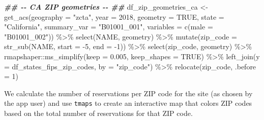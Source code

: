 \documentclass[
  11 pt,
  openany]{book}
\newenvironment{Shaded}{\begin{snugshade}}{\end{snugshade}}
\newcommand{\AttributeTok}[1]{\textcolor[rgb]{0.77,0.63,0.00}{#1}}
\newcommand{\ConstantTok}[1]{\textcolor[rgb]{0.00,0.00,0.00}{#1}}
\newcommand{\DecValTok}[1]{\textcolor[rgb]{0.00,0.00,0.81}{#1}}
\newcommand{\DocumentationTok}[1]{\textcolor[rgb]{0.56,0.35,0.01}{\textbf{\textit{#1}}}}
\newcommand{\FloatTok}[1]{\textcolor[rgb]{0.00,0.00,0.81}{#1}}
\newcommand{\FunctionTok}[1]{\textcolor[rgb]{0.00,0.00,0.00}{#1}}
\newcommand{\NormalTok}[1]{#1}
\newcommand{\OtherTok}[1]{\textcolor[rgb]{0.56,0.35,0.01}{#1}}
\newcommand{\SpecialCharTok}[1]{\textcolor[rgb]{0.00,0.00,0.00}{#1}}
\newcommand{\StringTok}[1]{\textcolor[rgb]{0.31,0.60,0.02}{#1}}
\begin{document}
\begin{Shaded}
\begin{Highlighting}[]
\DocumentationTok{\#\# {-}{-} CA ZIP geometries {-}{-} \#\#}
\NormalTok{df\_zip\_geometries\_ca }\OtherTok{\textless{}{-}} \FunctionTok{get\_acs}\NormalTok{(}\AttributeTok{geography =} \StringTok{"zcta"}\NormalTok{, }\AttributeTok{year =} \DecValTok{2018}\NormalTok{, }
                                \AttributeTok{geometry =} \ConstantTok{TRUE}\NormalTok{,}
                                \AttributeTok{state =} \StringTok{"California"}\NormalTok{,}
                                \AttributeTok{summary\_var =} \StringTok{"B01001\_001"}\NormalTok{,}
                                \AttributeTok{variables =} \FunctionTok{c}\NormalTok{(}\AttributeTok{male =} \StringTok{"B01001\_002"}\NormalTok{)) }\SpecialCharTok{\%\textgreater{}\%}
  \FunctionTok{select}\NormalTok{(NAME, geometry) }\SpecialCharTok{\%\textgreater{}\%}
  \FunctionTok{mutate}\NormalTok{(}\AttributeTok{zip\_code =} \FunctionTok{str\_sub}\NormalTok{(NAME, }\AttributeTok{start =} \SpecialCharTok{{-}}\DecValTok{5}\NormalTok{, }\AttributeTok{end =} \SpecialCharTok{{-}}\DecValTok{1}\NormalTok{)) }\SpecialCharTok{\%\textgreater{}\%}
  \FunctionTok{select}\NormalTok{(zip\_code, geometry) }\SpecialCharTok{\%\textgreater{}\%} 
\NormalTok{  rmapshaper}\SpecialCharTok{::}\FunctionTok{ms\_simplify}\NormalTok{(}\AttributeTok{keep =} \FloatTok{0.005}\NormalTok{, }\AttributeTok{keep\_shapes =} \ConstantTok{TRUE}\NormalTok{) }\SpecialCharTok{\%\textgreater{}\%} 
  \FunctionTok{left\_join}\NormalTok{(}\AttributeTok{y =}\NormalTok{ df\_states\_fips\_zip\_codes,}
            \AttributeTok{by =} \StringTok{"zip\_code"}\NormalTok{) }\SpecialCharTok{\%\textgreater{}\%} 
  \FunctionTok{relocate}\NormalTok{(zip\_code, }\AttributeTok{.before =} \DecValTok{1}\NormalTok{)}
\end{Highlighting}
\end{Shaded}

We calculate the number of reservations per ZIP code for the site (as chosen by the app user) and use \texttt{tmaps} to create an interactive map that colors ZIP codes based on the total number of reservations for that ZIP code.
\end{document}
